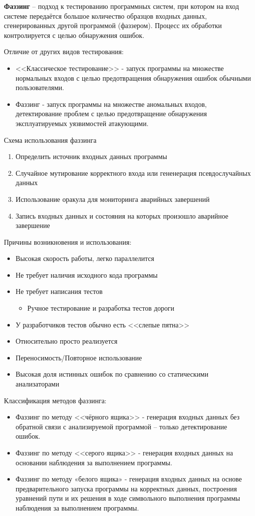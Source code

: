 \textbf{Фаззинг} – подход к тестированию программных систем, при котором на вход системе передаётся большое количество образцов входных данных, сгенерированных другой программой (фаззером). Процесс их обработки контролируется с целью обнаружения ошибок.

Отличие от других видов тестирования:
\begin{itemize}
    \item <<Классическое тестирование>> - запуск программы на множестве нормальных входов с целью предотвращения обнаружения ошибок обычными пользователями.
    \item Фаззинг - запуск программы на множестве аномальных входов, детектирование проблем с целью предотвращение обнаружения эксплуатируемых уязвимостей атакующими.
\end{itemize}

Схема использования фаззинга
\begin{enumerate}
    \item Определить источник входных данных программы
    \item  Случайное мутирование корректного входа или гененерация псевдослучайных данных
    \item Использование оракула для мониторинга аварийных завершений
    \item Запись входных данных и состояния на которых произошло аварийное
завершение
\end{enumerate}

Причины возникновения и использования:
\begin{itemize}
    \item Высокая скорость работы, легко параллелится
    \item Не требует наличия исходного кода программы
    \item Не требует написания тестов
    \begin{itemize}
        \item Ручное тестирование и разработка тестов дороги 
    \end{itemize}
    \item У разработчиков тестов обычно есть <<слепые пятна>>
    \item Относительно просто реализуется
    \item Переносимость/Повторное использование
    \item Высокая доля истинных ошибок по сравнению со статическими анализаторами
\end{itemize}

Классификация методов фаззинга:
\begin{itemize}
    \item Фаззинг по методу <<чёрного ящика>> - генерация входных данных без обратной связи с анализируемой программой – только детектирование ошибок.
    \item Фаззинг по методу <<серого ящика>> - генерация входных данных на основании наблюдения за выполнением программы.
    \item  Фаззинг по методу «белого ящика» - генерация входных данных на основе предварительного запуска программы на корректных данных, построения уравнений пути и их решения в ходе символьного выполнения программы наблюдения за выполнением программы.
\end{itemize}
